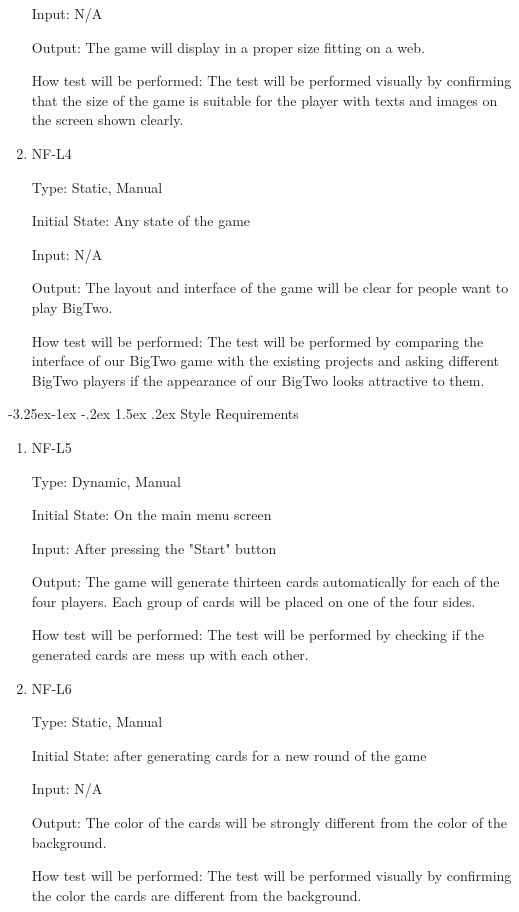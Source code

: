 \documentclass[12pt, titlepage]{article}
\makeatletter
\renewcommand\paragraph{\@startsection{paragraph}{4}{\z@}%
                                     {-3.25ex\@plus -1ex \@minus -.2ex}%
                                     {1.5ex \@plus .2ex}%
                                     {\normalfont\normalsize\bfseries}}
\makeatother
\begin{document}
\begin{enumerate}
Input: N/A
					
Output: The game will display in a proper size fitting on a web.
					
How test will be performed: The test will be performed visually by confirming that the size of the game is suitable for the player with texts and images on the screen shown clearly.

\item{NF-L4\\}

Type: Static, Manual
					
Initial State: Any state of the game
					
Input: N/A
					
Output: The layout and interface of the game will be clear for people want to play BigTwo.
					
How test will be performed: The test will be performed by comparing the interface of our BigTwo game with the existing projects and asking different BigTwo players if the appearance of our BigTwo looks attractive to them.
\end{enumerate}

\paragraph{Style Requirements}
\begin{enumerate}


\item{NF-L5\\}

Type: Dynamic, Manual
					
Initial State: On the main menu screen
					
Input: After pressing the "Start" button
					
Output: The game will generate thirteen cards automatically for each of the four players. Each group of cards will be placed on one of the four sides.
					
How test will be performed: The test will be performed by checking if the generated cards are mess up with each other. 

\item{NF-L6\\}

Type: Static, Manual
					
Initial State: after generating cards for a new round of the game
					
Input: N/A
					
Output: The color of the cards will be strongly different from the color of the background. 
					
How test will be performed: The test will be performed visually by confirming the color the cards are different from the background.

\end{enumerate}
\end{document}
